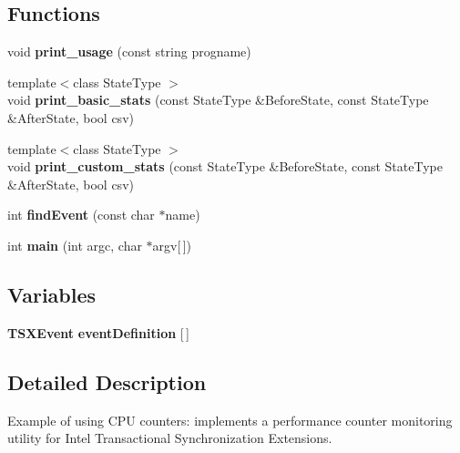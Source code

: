 \subsection*{Functions}
\begin{DoxyCompactItemize}
\item 
void {\bfseries print\+\_\+usage} (const string progname)\label{pcm-tsx_8cpp_a4e43544978d9afb2faf08dce11cab70c}

\item 
{\footnotesize template$<$class State\+Type $>$ }\\void {\bfseries print\+\_\+basic\+\_\+stats} (const State\+Type \&Before\+State, const State\+Type \&After\+State, bool csv)\label{pcm-tsx_8cpp_a5ded5e5cf069617e10262bf55eef2755}

\item 
{\footnotesize template$<$class State\+Type $>$ }\\void {\bfseries print\+\_\+custom\+\_\+stats} (const State\+Type \&Before\+State, const State\+Type \&After\+State, bool csv)\label{pcm-tsx_8cpp_a50e3da3c8c576ec27ac14afcb226717f}

\item 
int {\bfseries find\+Event} (const char $\ast$name)\label{pcm-tsx_8cpp_a6c01bd81dd058f924885a7ba93c94dcc}

\item 
int {\bfseries main} (int argc, char $\ast$argv[$\,$])\label{pcm-tsx_8cpp_a0ddf1224851353fc92bfbff6f499fa97}

\end{DoxyCompactItemize}
\subsection*{Variables}
\begin{DoxyCompactItemize}
\item 
{\bf T\+S\+X\+Event} {\bfseries event\+Definition} [$\,$]\label{pcm-tsx_8cpp_af6afa6575f1849ca84ef80ff04ba6e0a}

\end{DoxyCompactItemize}


\subsection{Detailed Description}
Example of using C\+PU counters\+: implements a performance counter monitoring utility for Intel Transactional Synchronization Extensions. 

